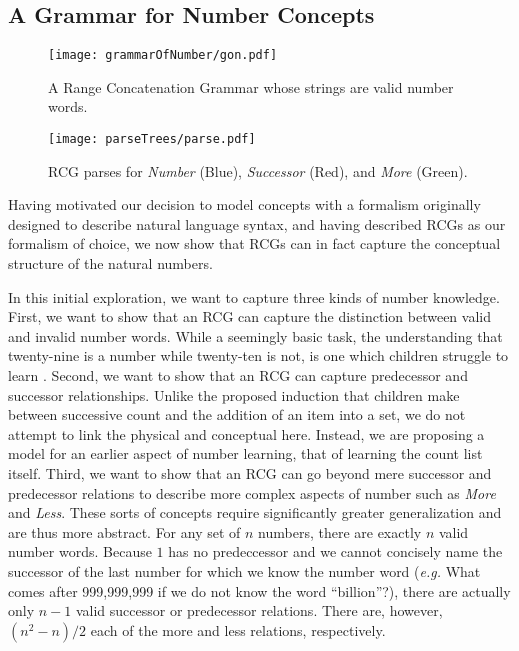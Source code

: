 \documentclass[10pt,letterpaper]{article}
\begin{document}
\subsection{A Grammar for Number Concepts}

\begin{figure*}[t]
  \begin{centering}
    \texttt{[image: grammarOfNumber/gon.pdf]}
    \caption{A Range Concatenation Grammar whose strings are valid number words.}
    \label{fig:gon}
  \end{centering}
\end{figure*}

\begin{figure*}[t]
  \begin{centering}
    \texttt{[image: parseTrees/parse.pdf]}
    \caption{RCG parses for \emph{Number} (Blue), \emph{Successor} (Red), and \emph{More} (Green).}
    \label{fig:parse}
  \end{centering}
\end{figure*}

Having motivated our decision to model concepts with a formalism
originally designed to describe natural language syntax, and having
described RCGs as our formalism of choice, we now show that RCGs can
in fact capture the conceptual structure of the natural numbers.

In this initial exploration, we want to capture three kinds of number
knowledge. First, we want to show that an RCG can capture the
distinction between valid and invalid number words. While a seemingly
basic task, the understanding that twenty-nine is a number while
twenty-ten is not, is one which children struggle to learn
\citep{FusRicBriar1982}. Second, we want to show that an RCG can
capture predecessor and successor relationships. Unlike the proposed
induction that children make between successive count and the addition
of an item into a set, we do not attempt to link the physical and
conceptual here. Instead, we are proposing a model for an earlier
aspect of number learning, that of learning the count list
itself. Third, we want to show that an RCG can go beyond mere
successor and predecessor relations to describe more complex aspects
of number such as \emph{More} and \emph{Less}. These sorts
of concepts require significantly greater generalization and are thus
more abstract. For any set of $n$ numbers, there are exactly $n$ valid
number words. Because $1$ has no predeccessor and we cannot concisely
name the successor of the last number for which we know the number
word ({\it e.g.}  What comes after 999,999,999 if we do not know the
word ``billion''?), there are actually only $n-1$ valid successor or
predecessor relations. There are, however, $(n^2-n)/2$ each of the
more and less relations, respectively.
\end{document}
